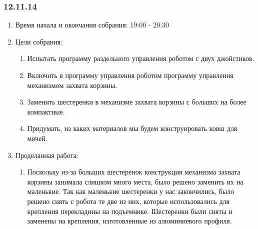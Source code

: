 
\subsubsection{12.11.14} 

\begin{enumerate} 
	\item Время начала и окончания собрания:
	19:00 - 20:30
	\item Цели собрания:
	\begin{enumerate}
		\item Испытать программу раздельного управления роботом с двух джойстиков.
		
		\item Включить в программу управления роботом программу управления механизмом захвата корзины.
		
		\item Заменить шестеренки в механизме захвата корзины с больших на более компактные.
		
		\item Придумать, из каких материалов мы будем конструировать ковш для мячей.
		
	\end{enumerate}
	
	\item Проделанная работа:
	\begin{enumerate}
		\item Поскольку из-за больших шестеренок конструкция механизма захвата корзины занимала слишком много места, было решено заменить их на маленькие. Так как маленькие шестеренки у нас закончились, было решено снять с робота те две из них, которые использовались для крепления перекладины на подъемнике. Шестеренки были сняты и заменены на крепления, изготовленные из алюминиевого профиля.
		

\end{enumerate}
\end{enumerate}
